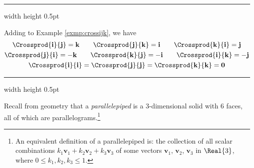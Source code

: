 \vspace{2mm}
\hrule width \textwidth height 0.5pt
\begin{exmp}\label{exmp:crossijkfull}
 Adding to Example \ref{exmp:crossijk}, we have
 \begin{gather*}
  \Crossprod{\textbf{i}}{\textbf{j}} = \textbf{k} \qquad \Crossprod{\textbf{j}}{\textbf{k}} = \textbf{i} \qquad
   \Crossprod{\textbf{k}}{\textbf{i}} = \textbf{j}\\
  \Crossprod{\textbf{j}}{\textbf{i}} = -\textbf{k} \qquad \Crossprod{\textbf{k}}{\textbf{j}} = -\textbf{i} \qquad
   \Crossprod{\textbf{i}}{\textbf{k}} = -\textbf{j}\\
  \Crossprod{\textbf{i}}{\textbf{i}} = \Crossprod{\textbf{j}}{\textbf{j}} = \Crossprod{\textbf{k}}{\textbf{k}} =
  \textbf{0}
 \end{gather*}
\end{exmp}
\hrule width \textwidth height 0.5pt
\vspace{4mm}

Recall from geometry that a \emph{parallelepiped} is a 3-dimensional solid with 6 faces, all of
which are parallelograms.\footnote{An equivalent definition of a  parallelepiped is: the collection of
all scalar combinations $k_{1}\textbf{v}_{1} + k_{2}\textbf{v}_{2} + k_{3}\textbf{v}_{3}$ of some vectors
$\textbf{v}_{1}$, $\textbf{v}_{2}$, $\textbf{v}_{3}$ in $\Real{3}$, where $0 \le k_{1}, k_{2}, k_{3} \le 1$.}

